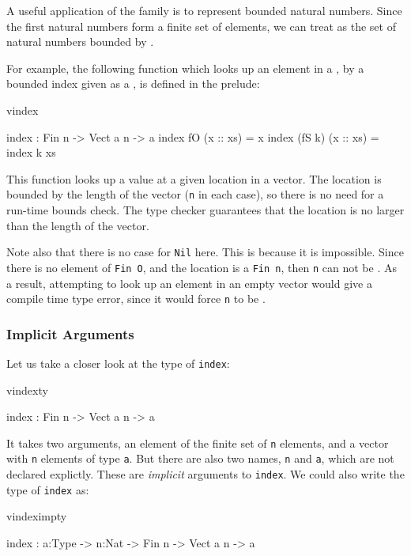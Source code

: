 A useful application of the  family is to represent bounded
natural numbers. Since the first  natural numbers form a finite
set of  elements, we can treat  as the set of natural
numbers bounded by . 

For example, the following function which looks up an element in a ,
by a bounded index given as a , is defined in the prelude:

\begin{SaveVerbatim}{vindex}

index : Fin n -> Vect a n -> a
index fO     (x :: xs) = x
index (fS k) (x :: xs) = index k xs

\end{SaveVerbatim}

\noindent
This function looks up a value at a given location in a vector. The location is
bounded by the length of the vector (\texttt{n} in each case), so there is no
need for a run-time bounds check. The type checker guarantees that the location
is no larger than the length of the vector.

Note also that there is no case for \texttt{Nil} here. This is because it is
impossible. Since there is no element of \texttt{Fin O}, and the location is a
\texttt{Fin n}, then \texttt{n} can not be .  As a result, attempting to
look up an element in an empty vector would give a compile time type error,
since it would force \texttt{n} to be .

\subsubsection{Implicit Arguments}

Let us take a closer look at the type of \texttt{index}:

\begin{SaveVerbatim}{vindexty}

index : Fin n -> Vect a n -> a

\end{SaveVerbatim}

\noindent
It takes two arguments, an element of the finite set of \texttt{n} elements, and a vector
with \texttt{n} elements of type \texttt{a}. But there are also two names, 
\texttt{n} and \texttt{a}, which are not declared explictly. These are \emph{implicit}
arguments to \texttt{index}. We could also write the type of \texttt{index} as:

\begin{SaveVerbatim}{vindeximpty}

index : {a:Type} -> {n:Nat} -> Fin n -> Vect a n -> a

\end{SaveVerbatim}

